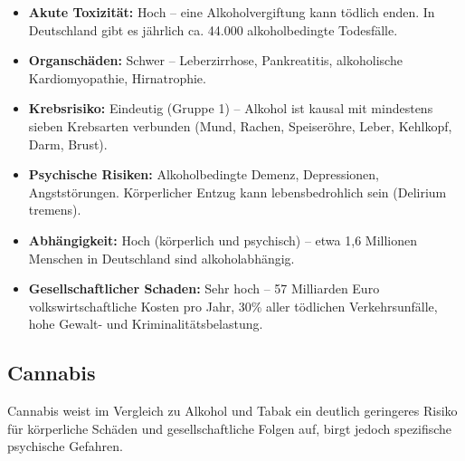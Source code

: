 \documentclass[11pt,a4paper]{article}
\begin{document}
	\begin{itemize}[leftmargin=*, noitemsep]
		\item \textbf{Akute Toxizität:} Hoch – eine Alkoholvergiftung kann tödlich enden. In Deutschland gibt es jährlich ca. 44.000 alkoholbedingte Todesfälle. \cite{who-deaths}\cite{dhs-deaths}
		\item \textbf{Organschäden:} Schwer – Leberzirrhose, Pankreatitis, alkoholische Kardiomyopathie, Hirnatrophie.
		\item \textbf{Krebsrisiko:} Eindeutig (Gruppe 1) – Alkohol ist kausal mit mindestens sieben Krebsarten verbunden (Mund, Rachen, Speiseröhre, Leber, Kehlkopf, Darm, Brust). \cite{who-carcinogen}
		\item \textbf{Psychische Risiken:} Alkoholbedingte Demenz, Depressionen, Angststörungen. Körperlicher Entzug kann lebensbedrohlich sein (Delirium tremens).
		\item \textbf{Abhängigkeit:} Hoch (körperlich und psychisch) – etwa 1,6 Millionen Menschen in Deutschland sind alkoholabhängig. \cite{dhs-abhaengigkeit}
		\item \textbf{Gesellschaftlicher Schaden:} Sehr hoch – 57 Milliarden Euro volkswirtschaftliche Kosten pro Jahr, 30\% aller tödlichen Verkehrsunfälle, hohe Gewalt- und Kriminalitätsbelastung. \cite{dhs-costs}
	\end{itemize}
	
	\subsection{Cannabis}
	
	Cannabis weist im Vergleich zu Alkohol und Tabak ein deutlich geringeres Risiko für körperliche Schäden und gesellschaftliche Folgen auf, birgt jedoch spezifische psychische Gefahren. \cite{nida-no-overdose}
	
\end{document}
